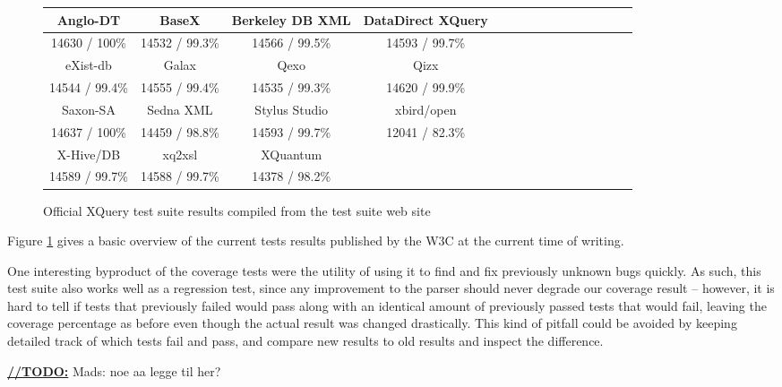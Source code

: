\begin{figure}[h!]
  \begin{center}
    \begin{tabular}{ |c | c | c | c | c | c | c | c | c | c | c | c | c | c | c | }
      \hline
      Anglo-DT        & BaseX           & Berkeley DB XML   & DataDirect XQuery \\ \hline
      14630 / 100\%   & 14532 / 99.3\%  & 14566 / 99.5\%    & 14593 / 99.7\%  \\ \hline \hline
      eXist-db        & Galax           & Qexo              & Qizx \\ \hline            
      14544 / 99.4\%  & 14555 / 99.4\%  & 14535 / 99.3\%    & 14620 / 99.9\% \\ \hline \hline
      Saxon-SA        & Sedna XML       & Stylus Studio     & xbird/open \\ \hline
      14637 / 100\%   & 14459 / 98.8\%  & 14593 / 99.7\%    & 12041 / 82.3\% \\ \hline \hline
      X-Hive/DB       & xq2xsl          & XQuantum          & \\ \hline
      14589 / 99.7\%   & 14588 / 99.7\%  & 14378 / 98.2\%    & \\ 
    \hline
    \end{tabular}
  \end{center}
  \caption[Official XQuery test suite results]{Official XQuery test suite
  results compiled from the test suite web site\cite{w3ctestresults}} 
  \label{figure:table:w3c_test_results}
\end{figure}

Figure \ref{figure:table:w3c_test_results} gives a basic overview of the current
tests results published by the W3C at the current time of writing.

One interesting byproduct of the coverage tests were the utility of using it to
find and fix previously unknown bugs quickly. As such, this test suite also
works well as a regression test, since any improvement to the parser should
never degrade our coverage result -- however, it is hard to tell if tests that
previously failed would pass along with an identical amount of previously
passed tests that would fail, leaving the coverage percentage as before even
though the actual result was changed drastically. This kind of pitfall could be
avoided by keeping detailed track of which tests fail and pass, and compare new
results to old results and inspect the difference.

\underline{\textbf{\LARGE //TODO:}} Mads: noe aa legge til her?
 

